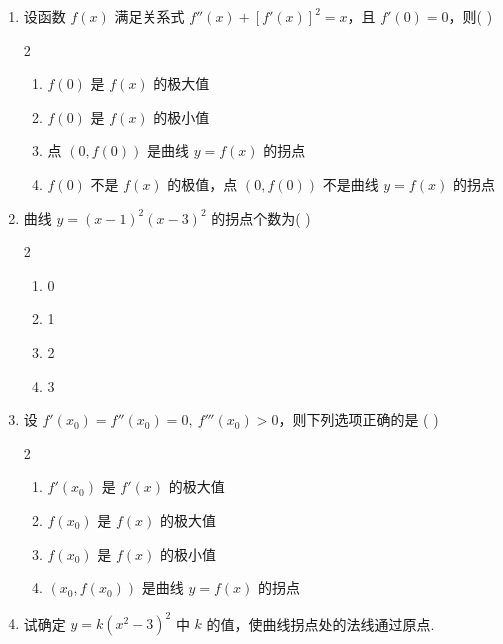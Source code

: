\begin{enumerate}[label=\textbf{\arabic*.}, itemsep=6cm]
    \item 设函数 $f(x)$ 满足关系式 $f''(x)+[f'(x)]^2=x$，且 $f'(0)=0$，则( )
    \begin{multicols}{2}
    \begin{enumerate}
        \item $f(0)$ 是 $f(x)$ 的极大值
        \item $f(0)$ 是 $f(x)$ 的极小值
        \item 点 $(0,f(0))$ 是曲线 $y=f(x)$ 的拐点
        \item $f(0)$ 不是 $f(x)$ 的极值，点 $(0,f(0))$ 不是曲线 $y=f(x)$ 的拐点
    \end{enumerate}
    \end{multicols}
    
    \item 曲线 $y=(x-1)^2(x-3)^2$ 的拐点个数为( )
    \begin{multicols}{2}
    \begin{enumerate}
        \item 0
        \item 1
        \item 2
        \item 3
    \end{enumerate}
    \end{multicols}
    
    \item 设 $f'(x_0)=f''(x_0)=0,\ f'''(x_0)>0$，则下列选项正确的是 ( )
    \begin{multicols}{2}
    \begin{enumerate}
        \item $f'(x_0)$ 是 $f'(x)$ 的极大值
        \item $f(x_0)$ 是 $f(x)$ 的极大值
        \item $f(x_0)$ 是 $f(x)$ 的极小值
        \item $(x_0,f(x_0))$ 是曲线 $y=f(x)$ 的拐点
    \end{enumerate}
    \end{multicols}
    
    \item 试确定 $y=k(x^2-3)^2$ 中 $k$ 的值，使曲线拐点处的法线通过原点.
\end{enumerate}

\newpage

